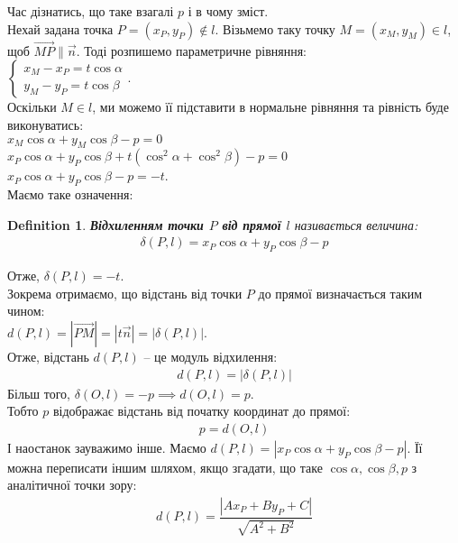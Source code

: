\documentclass[a4paper, 10pt]{extarticle}
\theoremstyle{theoremdd}
\theoremstyle{theoremdd}
\newtheorem{definition}[theorem]{Definition}
\theoremstyle{theoremdd}
\theoremstyle{theoremdd}
\theoremstyle{theoremdd}
\theoremstyle{theoremdd}
\theoremstyle{theoremdd}
\theoremstyle{theoremdd}
\begin{document}
Час дізнатись, що таке взагалі $p$ і в чому зміст.\\
Нехай задана точка $P = (x_P, y_P) \not \in l$. Візьмемо таку точку $M = (x_M, y_M) \in l$, щоб $\overrightarrow{MP} \parallel \vec{n}$. Тоді розпишемо параметричне рівняння:\\
$\begin{cases}
x_M - x_P = t \cos \alpha\\
y_M - y_P = t \cos \beta
\end{cases}.
$\\
Оскільки $M \in l$, ми можемо її підставити в нормальне рівняння та рівність буде виконуватись:\\
$x_M \cos \alpha + y_M \cos \beta - p = 0$\\
$x_P \cos \alpha + y_P \cos \beta + t(\cos^2 \alpha + \cos^2 \beta) - p = 0$\\
$x_P \cos \alpha + y_P \cos \beta -p = -t$.\\
Маємо таке означення:
\begin{definition}
\textbf{Відхиленням точки $P$ від прямої $l$} називається величина:
\begin{align*}
\delta(P,l) = x_P \cos \alpha + y_P \cos \beta - p
\end{align*}
\end{definition}

Отже, $\delta(P,l)=-t$.\\
Зокрема отримаємо, що відстань від точки $P$ до прямої визначається таким чином:\\
$d(P,l)=|\overrightarrow{PM}| = |t \vec{n}| = |\delta(P,l)|$.\\
Отже, відстань $d(P,l)$ -- це модуль відхилення:
\begin{align*}
d(P,l) = |\delta(P,l)|
\end{align*}
Більш того, $\delta(O,l) = -p \implies d(O,l) = p$.\\
Тобто $p$ відображає відстань від початку координат до прямої:
\begin{align*}
p = d(O,l)
\end{align*}
І наостанок зауважимо інше. Маємо $d(P,l) = |x_P \cos \alpha + y_P \cos \beta - p|$. Її можна переписати іншим шляхом, якщо згадати, що таке $\cos \alpha, \cos \beta, p$ з аналітичної точки зору:
\begin{align*}
d(P,l) = \dfrac{|Ax_P + By_P + C|}{\sqrt{A^2+B^2}}
\end{align*}
\end{document}
